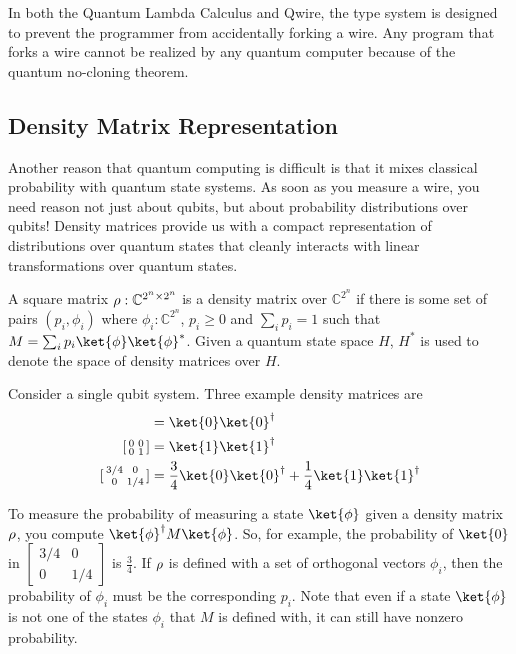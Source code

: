 In both the Quantum Lambda Calculus and Qwire, the type system is designed to prevent the programmer from accidentally forking a wire.
Any program that forks a wire cannot be realized by any quantum computer because of the quantum no-cloning theorem.

\subsection{Density Matrix Representation}
\label{sec:density}
Another reason that quantum computing is difficult is that it mixes classical probability with quantum state systems.
As soon as you measure a wire, you need reason not just about qubits, but about probability distributions over qubits!
Density matrices provide us with a compact representation of distributions over quantum states that cleanly interacts with linear transformations over quantum states.
\begin{definition}
A square matrix $\rho : \mathbb{C}^{2^n\times 2^n}$ is a density matrix over $\mathbb{C}^{2^n}$ if there is some set of pairs $(p_i,\phi_i)$ where $\phi_i: \mathbb{C}^{2^n}$, $p_i\geq 0$ and $\sum_{i}p_i=1$ such that
$M=\sum_{i}p_i\ket{\phi}\ket{\phi}^*$. Given a quantum state space $H$, $H^*$ is used to denote the space of density matrices over $H$.
\end{definition}
Consider a single qubit system. Three example density matrices are
\begin{align}
[\begin{smallmatrix} 1 & 0 \\ 0 & 0 \end{smallmatrix}]&= \ket{0}\ket{0}^\dagger\\
 [\begin{smallmatrix} 0 & 0 \\ 0 & 1 \end{smallmatrix}]&= \ket{1}\ket{1}^\dagger\\
 [\begin{smallmatrix} 3/4 & 0 \\ 0 & 1/4 \end{smallmatrix}]&= \frac{3}{4}\ket{0}\ket{0}^\dagger + \frac{1}{4}\ket{1}\ket{1}^\dagger
\end{align}

To measure the probability of measuring a state $\ket{\phi}$ given a density matrix $\rho$, you compute $\ket{\phi}^\dagger M\ket{\phi}$.
So, for example, the probability of $\ket{0}$ in $[\begin{smallmatrix} 3/4 & 0 \\ 0 & 1/4 \end{smallmatrix}]$ is $\frac{3}{4}$.
If $\rho$ is defined with a set of orthogonal vectors $\phi_i$, then the probability of $\phi_i$ must be the corresponding $p_i$.
Note that even if a state $\ket{\phi}$ is not one of the states $\phi_i$ that $M$ is defined with, it can still have nonzero probability.

